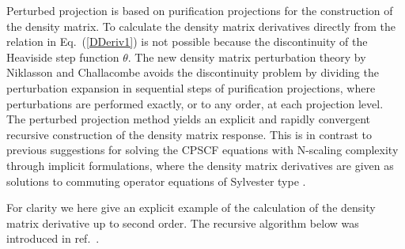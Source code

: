 \documentclass[prl,aps,twocolumn,showpacs,twocolumngrid,superbib]{revtex4}
\begin{document}
Perturbed projection is based on purification projections for the 
construction of the density matrix. To calculate the
density matrix derivatives directly from the relation in Eq.\ (\ref{DDeriv1})
is not possible because the discontinuity of the Heaviside step function $\theta$.
The new density matrix perturbation theory by Niklasson and Challacombe
\cite{ANiklasson04} avoids the discontinuity problem
by dividing the perturbation expansion in sequential steps of 
purification projections, where perturbations are performed exactly, or to 
any order, at each projection level. The perturbed projection method yields
an explicit and rapidly convergent recursive construction of
the density matrix response. This is in contrast to previous suggestions for
solving the CPSCF equations with N-scaling complexity through implicit
formulations, where the density matrix derivatives are given as solutions
to commuting operator equations of Sylvester type 
\cite{Ochsenfeld97,Helgaker_2001}.


For clarity we here give an explicit example of the calculation
of the density matrix derivative up to second order. The recursive
algorithm below was introduced in ref.\ \cite{ANiklasson04}.
\end{document}
